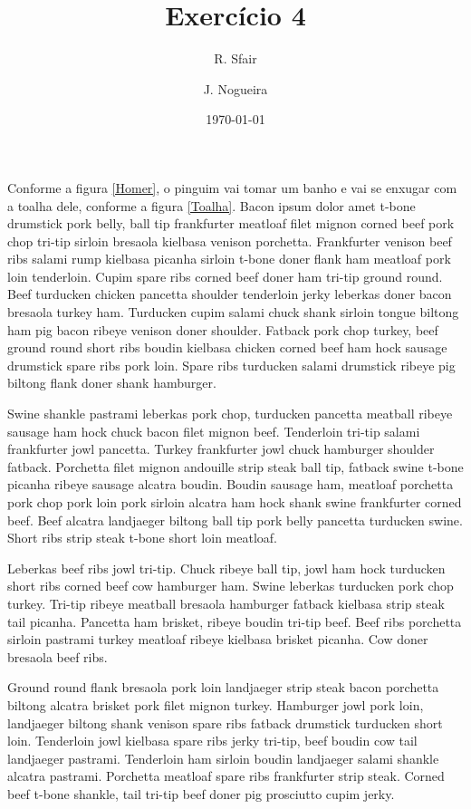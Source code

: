\documentclass[a4paper,11pt]{article}
\title{Exercício 4}
\author{R. Sfair \and J. Nogueira}
\date{\today}
\begin{document}
\maketitle

Conforme a figura \ref{Homer}, o pinguim vai tomar um banho e vai se enxugar com a toalha dele, conforme a figura \ref{Toalha}.
Bacon ipsum dolor amet t-bone drumstick pork belly, ball tip frankfurter meatloaf filet mignon corned beef pork chop tri-tip sirloin bresaola kielbasa venison porchetta. Frankfurter venison beef ribs salami rump kielbasa picanha sirloin t-bone doner flank ham meatloaf pork loin tenderloin. Cupim spare ribs corned beef doner ham tri-tip ground round. Beef turducken chicken pancetta shoulder tenderloin jerky leberkas doner bacon bresaola turkey ham. Turducken cupim salami chuck shank sirloin tongue biltong ham pig bacon ribeye venison doner shoulder. Fatback pork chop turkey, beef ground round short ribs boudin kielbasa chicken corned beef ham hock sausage drumstick spare ribs pork loin. Spare ribs turducken salami drumstick ribeye pig biltong flank doner shank hamburger.

Swine shankle pastrami leberkas pork chop, turducken pancetta meatball ribeye sausage ham hock chuck bacon filet mignon beef. Tenderloin tri-tip salami frankfurter jowl pancetta. Turkey frankfurter jowl chuck hamburger shoulder fatback. Porchetta filet mignon andouille strip steak ball tip, fatback swine t-bone picanha ribeye sausage alcatra boudin. Boudin sausage ham, meatloaf porchetta pork chop pork loin pork sirloin alcatra ham hock shank swine frankfurter corned beef. Beef alcatra landjaeger biltong ball tip pork belly pancetta turducken swine. Short ribs strip steak t-bone short loin meatloaf.

Leberkas beef ribs jowl tri-tip. Chuck ribeye ball tip, jowl ham hock turducken short ribs corned beef cow hamburger ham. Swine leberkas turducken pork chop turkey. Tri-tip ribeye meatball bresaola hamburger fatback kielbasa strip steak tail picanha. Pancetta ham brisket, ribeye boudin tri-tip beef. Beef ribs porchetta sirloin pastrami turkey meatloaf ribeye kielbasa brisket picanha. Cow doner bresaola beef ribs.

Ground round flank bresaola pork loin landjaeger strip steak bacon porchetta biltong alcatra brisket pork filet mignon turkey. Hamburger jowl pork loin, landjaeger biltong shank venison spare ribs fatback drumstick turducken short loin. Tenderloin jowl kielbasa spare ribs jerky tri-tip, beef boudin cow tail landjaeger pastrami. Tenderloin ham sirloin boudin landjaeger salami shankle alcatra pastrami. Porchetta meatloaf spare ribs frankfurter strip steak. Corned beef t-bone shankle, tail tri-tip beef doner pig prosciutto cupim jerky.
\end{document}
